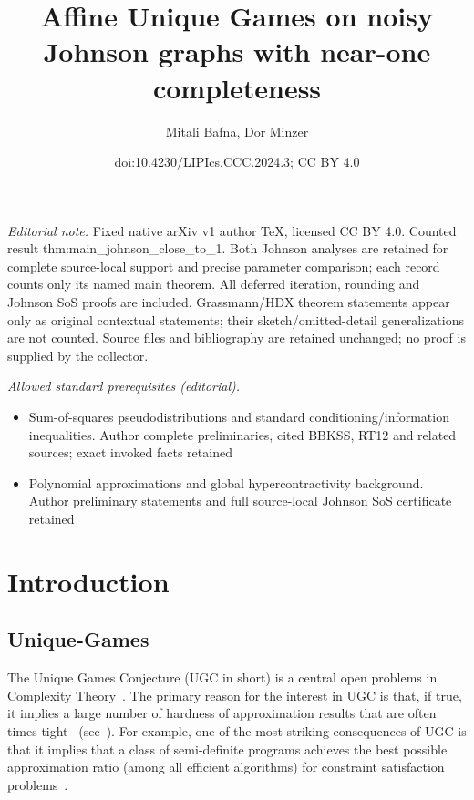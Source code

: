 \documentclass[11pt]{article}
\title{Affine Unique Games on noisy Johnson graphs with near-one completeness}
\author{Mitali Bafna, Dor Minzer}
\date{doi:10.4230/LIPIcs.CCC.2024.3; CC BY 4.0}
\theoremstyle{definition}
\begin{document}
\maketitle
\noindent\textit{Editorial note.} Fixed native arXiv v1 author TeX, licensed CC BY 4.0. Counted result thm:main\_johnson\_close\_to\_1. Both Johnson analyses are retained for complete source-local support and precise parameter comparison; each record counts only its named main theorem. All deferred iteration, rounding and Johnson SoS proofs are included. Grassmann/HDX theorem statements appear only as original contextual statements; their sketch/omitted-detail generalizations are not counted. Source files and bibliography are retained unchanged; no proof is supplied by the collector.\par\medskip
\noindent\textit{Allowed standard prerequisites (editorial).}\begin{itemize}
\item Sum-of-squares pseudodistributions and standard conditioning/information inequalities. Author complete preliminaries, cited BBKSS, RT12 and related sources; exact invoked facts retained
\item Polynomial approximations and global hypercontractivity background. Author preliminary statements and full source-local Johnson SoS certificate retained
\end{itemize}\medskip
\section{Introduction}
\subsection{Unique-Games}\label{sec:ug}
The Unique Games Conjecture (UGC in short) 
is a central open problems in Complexity Theory~\cite{Khot02}.
The primary reason for the interest in UGC is that, if true, it
implies a large number of hardness of approximation results 
that are often times tight~\cite{KhotR08,KhotKMO07,Austrin,KNSgroth,Raghavendra08}
(see~\cite{KhotICM,trevisan2012khot}). For example, 
one of the most striking
consequences of UGC is that it 
implies that a class of semi-definite programs
achieves the best possible approximation ratio (among all 
efficient algorithms) for constraint satisfaction problems~\cite{Raghavendra08}.
\end{document}
